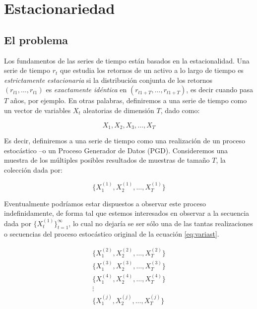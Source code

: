 \documentclass[
]{book}
\begin{document}
\hypertarget{estacionariedad}{%
\chapter{Estacionariedad}\label{estacionariedad}}

\hypertarget{el-problema-4}{%
\section{El problema}\label{el-problema-4}}

Los fundamentos de las series de tiempo están basados en la
estacionalidad. Una serie de tiempo \({r_t}\) que estudia los retornos de
un activo a lo largo de tiempo es \emph{estrictamente estacionaria} si la
distribución conjunta de los retornos \((r_{t1},\dots,r_{t1})\) es
\emph{exactamente idéntica} en \((r_{t1+T},\dots,r_{t1+T})\), es decir cuando
pasa \(T\) años, por ejemplo. En otras palabras, definiremos a una serie
de tiempo como un vector de variables \({X_t}\) aleatorias de dimensión
\(T\), dado como:

\begin{equation}
    X_1, X_2, X_3, \ldots ,X_T
\end{equation}

Es decir, definiremos a una serie de tiempo como una
realización de un proceso estocástico --o un Proceso Generador de Datos
(PGD). Consideremos una muestra de los múltiples posibles resultados de
muestras de tamaño \(T\), la colección dada por:

\begin{equation}
    \{X^{(1)}_1, X^{(1)}_2, \ldots, X^{(1)}_T\}
    \label{eq:variast}
\end{equation}

Eventualmente podríamos estar dispuestos a observar este proceso
indefinidamente, de forma tal que estemos interesados en observar a la
secuencia dada por \(\{ X^{(1)}_t \}^{\infty}_{t = 1}\), lo cual no
dejaría se ser sólo una de las tantas realizaciones o secuencias del
proceso estocástico original de la ecuación \eqref{eq:variast}.

\begin{eqnarray*}
    & \{X^{(2)}_1, X^{(2)}_2, \ldots, X^{(2)}_T\} & \\
    & \{X^{(3)}_1, X^{(3)}_2, \ldots, X^{(3)}_T\} & \\
    & \{X^{(4)}_1, X^{(4)}_2, \ldots, X^{(4)}_T\} & \\
    & \vdots & \\
    & \{X^{(j)}_1, X^{(j)}_2, \ldots, X^{(j)}_T\} & 
\end{eqnarray*}
\end{document}
